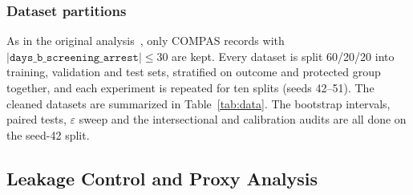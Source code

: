 \documentclass[conference]{IEEEtran}
\newcommand{\eps}{\varepsilon}
\begin{document}
\subsubsection{Dataset partitions} As in the original analysis~\cite{angwin2016machine}, only COMPAS records with $|\texttt{days\_b\_screening\_arrest}|\le 30$ are kept. Every dataset is split 60/20/20 into training, validation and test sets, stratified on outcome and protected group together, and each experiment is repeated for ten splits (seeds 42--51). The cleaned datasets are summarized in Table~\ref{tab:data}. The bootstrap intervals, paired tests, $\eps$ sweep and the intersectional and calibration audits are all done on the seed-42 split.

\begin{table}[t]
\centering
\caption{Benchmark Datasets After Cleaning}
\label{tab:data}
\setlength{\tabcolsep}{3pt}
\renewcommand{\arraystretch}{1.12}
\end{table}

\subsection{Leakage Control and Proxy Analysis}
\end{document}
